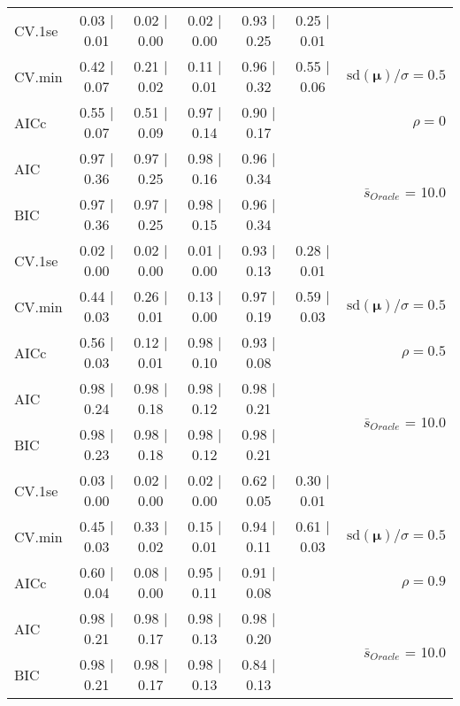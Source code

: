 \begin{table}
\begin{center}
\begin{tabular}{l*{5}{c}|r}
 \hline 
CV.1se & 0.03 $\mid$ 0.01 & 0.02 $\mid$ 0.00 & 0.02 $\mid$ 0.00 & 0.93 $\mid$ 0.25 & 0.25 $\mid$ 0.01 & \\
CV.min & 0.42 $\mid$ 0.07 & 0.21 $\mid$ 0.02 & 0.11 $\mid$ 0.01 & 0.96 $\mid$ 0.32 & 0.55 $\mid$ 0.06 &  $\mathrm{sd}(\mathbf{\mu})/\sigma=0.5$ \\
AICc & 0.55 $\mid$ 0.07 & 0.51 $\mid$ 0.09 & 0.97 $\mid$ 0.14 & 0.90 $\mid$ 0.17 & & $\rho=0$ \\
AIC & 0.97 $\mid$ 0.36 & 0.97 $\mid$ 0.25 & 0.98 $\mid$ 0.16 & 0.96 $\mid$ 0.34 & &  \multirow{2}{*}{$\bar{s}_{Oracle}$ = 10.0} \\
BIC & 0.97 $\mid$ 0.36 & 0.97 $\mid$ 0.25 & 0.98 $\mid$ 0.15 & 0.96 $\mid$ 0.34 & &  \\
 \hline 
CV.1se & 0.02 $\mid$ 0.00 & 0.02 $\mid$ 0.00 & 0.01 $\mid$ 0.00 & 0.93 $\mid$ 0.13 & 0.28 $\mid$ 0.01 & \\
CV.min & 0.44 $\mid$ 0.03 & 0.26 $\mid$ 0.01 & 0.13 $\mid$ 0.00 & 0.97 $\mid$ 0.19 & 0.59 $\mid$ 0.03 &  $\mathrm{sd}(\mathbf{\mu})/\sigma=0.5$ \\
AICc & 0.56 $\mid$ 0.03 & 0.12 $\mid$ 0.01 & 0.98 $\mid$ 0.10 & 0.93 $\mid$ 0.08 & & $\rho=0.5$ \\
AIC & 0.98 $\mid$ 0.24 & 0.98 $\mid$ 0.18 & 0.98 $\mid$ 0.12 & 0.98 $\mid$ 0.21 & &  \multirow{2}{*}{$\bar{s}_{Oracle}$ = 10.0} \\
BIC & 0.98 $\mid$ 0.23 & 0.98 $\mid$ 0.18 & 0.98 $\mid$ 0.12 & 0.98 $\mid$ 0.21 & &  \\
 \hline 
CV.1se & 0.03 $\mid$ 0.00 & 0.02 $\mid$ 0.00 & 0.02 $\mid$ 0.00 & 0.62 $\mid$ 0.05 & 0.30 $\mid$ 0.01 & \\
CV.min & 0.45 $\mid$ 0.03 & 0.33 $\mid$ 0.02 & 0.15 $\mid$ 0.01 & 0.94 $\mid$ 0.11 & 0.61 $\mid$ 0.03 &  $\mathrm{sd}(\mathbf{\mu})/\sigma=0.5$ \\
AICc & 0.60 $\mid$ 0.04 & 0.08 $\mid$ 0.00 & 0.95 $\mid$ 0.11 & 0.91 $\mid$ 0.08 & & $\rho=0.9$ \\
AIC & 0.98 $\mid$ 0.21 & 0.98 $\mid$ 0.17 & 0.98 $\mid$ 0.13 & 0.98 $\mid$ 0.20 & &  \multirow{2}{*}{$\bar{s}_{Oracle}$ = 10.0} \\
BIC & 0.98 $\mid$ 0.21 & 0.98 $\mid$ 0.17 & 0.98 $\mid$ 0.13 & 0.84 $\mid$ 0.13 & &  \\
 \hline 
\end{tabular}
\end{center}
\vspace{-1cm}
\end{table}




